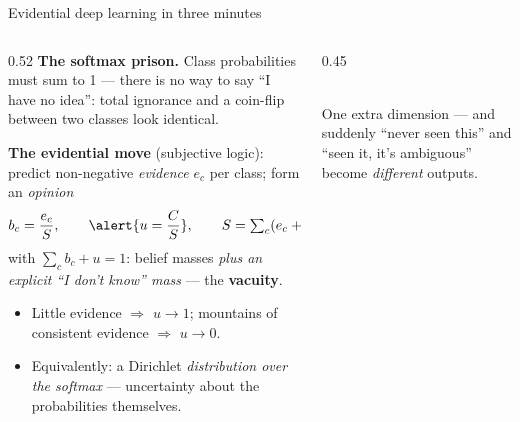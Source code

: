 \documentclass[aspectratio=169,10pt]{beamer}
\newcommand{\bad}[1]{{\color{uHigh}#1}}
\begin{document}
\begin{frame}{Evidential deep learning in three minutes}
  \begin{columns}[T]
    \begin{column}{0.52\textwidth}
      \textbf{The softmax prison.} Class probabilities must sum to 1 ---
      there is \bad{no way to say ``I have no idea''}: total ignorance and
      a coin-flip between two classes look identical.
      \vspace{1mm}

      \textbf{The evidential move} (subjective logic): predict non-negative
      \emph{evidence} $e_c$ per class; form an \emph{opinion}
      \begin{equation*}
        b_c = \frac{e_c}{S}, \qquad
        \alert{u = \frac{C}{S}}, \qquad
        S = \textstyle\sum_c (e_c + 1),
      \end{equation*}
      with $\sum_c b_c + u = 1$: belief masses \emph{plus an explicit
      ``I don't know'' mass} --- the \textbf{vacuity}.
      \vspace{1mm}
      \begin{itemize}
        \item Little evidence $\Rightarrow$ $u \to 1$; mountains of
              consistent evidence $\Rightarrow$ $u \to 0$.
        \item Equivalently: a Dirichlet \emph{distribution over the
              softmax} --- uncertainty about the probabilities themselves.
      \end{itemize}
    \end{column}
    \begin{column}{0.45\textwidth}
      \centering
      \\[2mm]
      \small One extra dimension --- and suddenly ``never seen this'' and
      ``seen it, it's ambiguous'' become \emph{different} outputs.
    \end{column}
  \end{columns}
\end{frame}
\end{document}
